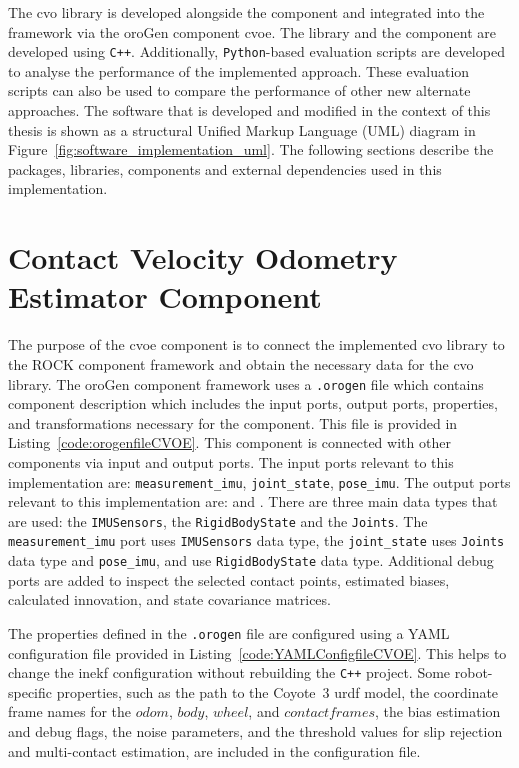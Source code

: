 \documentclass[report.tex]{subfiles}
\begin{document}
The \gls{cvo} library is developed alongside the component and integrated into the framework via the oroGen component \gls{cvoe}. The library and the component are developed using \texttt{C++}. Additionally, \texttt{Python}-based evaluation scripts are developed to analyse the performance of the implemented approach. These evaluation scripts can also be used to compare the performance of other new alternate approaches. The software that is developed and modified in the context of this thesis is shown as a structural Unified Markup Language (UML) diagram in Figure~\ref{fig:software_implementation_uml}. The following sections describe the packages, libraries, components and external dependencies used in this implementation. 

\section{Contact Velocity Odometry Estimator Component}

The purpose of the \gls{cvoe} component is to connect the implemented \gls{cvo} library to the ROCK component framework and obtain the necessary data for the \gls{cvo} library. The oroGen component framework uses a \texttt{.orogen} file which contains component description which includes the input ports, output ports, properties, and transformations necessary for the component. This file is provided in Listing~\ref{code:orogenfileCVOE}. This component is connected with other components via input and output ports. The input ports relevant to this implementation are: \texttt{measurement\_imu}, \texttt{joint\_state}, \texttt{pose\_imu}. The output ports relevant to this implementation are:  and . There are three main data types that are used: the \texttt{IMUSensors}, the \texttt{RigidBodyState} and the \texttt{Joints}. The \texttt{measurement\_imu} port uses \texttt{IMUSensors} data type, the \texttt{joint\_state} uses \texttt{Joints} data type and \texttt{pose\_imu},  and  use \texttt{RigidBodyState} data type. Additional debug ports are added to inspect the selected contact points, estimated biases, calculated innovation, and state covariance matrices. 

The properties defined in the \texttt{.orogen} file are configured using a YAML configuration file provided in Listing~\ref{code:YAMLConfigfileCVOE}. This helps to change the \gls{inekf} configuration without rebuilding the \texttt{C++} project. Some robot-specific properties, such as the path to the Coyote~3 \gls{urdf} model, the coordinate frame names for the $odom$, $body$, $wheel$, and $contact frames$, the bias estimation and debug flags, the noise parameters, and the threshold values for slip rejection and multi-contact estimation, are included in the configuration file.
\end{document}
